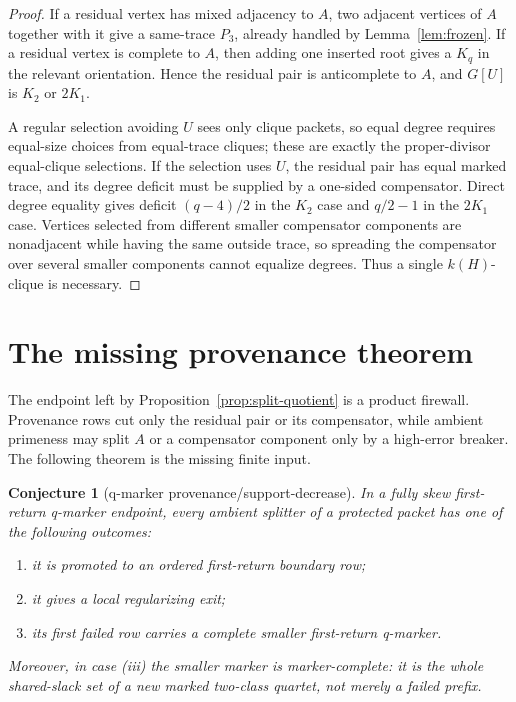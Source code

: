 \documentclass[11pt]{article}
\newtheorem{conjecture}[theorem]{Conjecture}
\theoremstyle{remark}
\begin{document}
\begin{proof}
If a residual vertex has mixed adjacency to \(A\), two adjacent vertices of
\(A\) together with it give a same-trace \(P_3\), already handled by
Lemma~\ref{lem:frozen}.  If a residual vertex is complete to \(A\), then adding
one inserted root gives a \(K_q\) in the relevant orientation.  Hence the
residual pair is anticomplete to \(A\), and \(G[U]\) is \(K_2\) or \(2K_1\).

A regular selection avoiding \(U\) sees only clique packets, so equal degree
requires equal-size choices from equal-trace cliques; these are exactly the
proper-divisor equal-clique selections.  If the selection uses \(U\), the
residual pair has equal marked trace, and its degree deficit must be supplied by
a one-sided compensator.  Direct degree equality gives deficit \((q-4)/2\) in
the \(K_2\) case and \(q/2-1\) in the \(2K_1\) case.  Vertices selected from
different smaller compensator components are nonadjacent while having the same
outside trace, so spreading the compensator over several smaller components
cannot equalize degrees.  Thus a single \(k(H)\)-clique is necessary.
\end{proof}

\section{The missing provenance theorem}

The endpoint left by Proposition~\ref{prop:split-quotient} is a product
firewall.  Provenance rows cut only the residual pair or its compensator, while
ambient primeness may split \(A\) or a compensator component only by a
high-error breaker.  The following theorem is the missing finite input.

\begin{conjecture}[q-marker provenance/support-decrease]\label{conj:qmarker}
In a fully skew first-return q-marker endpoint, every ambient splitter of a
protected packet has one of the following outcomes:
\begin{enumerate}[label=(\roman*)]
\item it is promoted to an ordered first-return boundary row;
\item it gives a local regularizing exit;
\item its first failed row carries a complete smaller first-return q-marker.
\end{enumerate}
Moreover, in case (iii) the smaller marker is marker-complete: it is the whole
shared-slack set of a new marked two-class quartet, not merely a failed prefix.
\end{conjecture}
\end{document}
